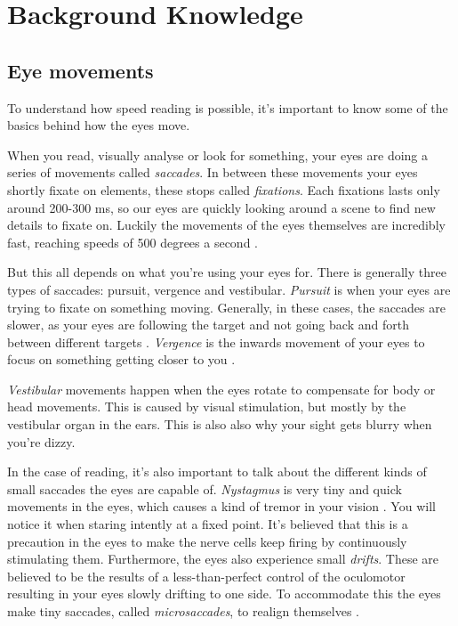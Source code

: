 \section{Background Knowledge}

\subsection{Eye movements}
To understand how speed reading is possible, it's important to know some of the basics behind how the eyes move.

When you read, visually analyse or look for something, your eyes are doing a series of movements called \textit{saccades}. In between these movements your eyes shortly fixate on elements, these stops called \textit{fixations}. Each fixations lasts only around 200-300 ms, so our eyes are quickly looking around a scene to find new details to fixate on. Luckily the movements of the eyes themselves are incredibly fast, reaching speeds of 500 degrees a second \cite{eyeMovement}.

But this all depends on what you're using your eyes for. There is generally three types of saccades: pursuit, vergence and vestibular. \textit{Pursuit} is when your eyes are trying to fixate on something moving. Generally, in these cases, the saccades are slower, as your eyes are following the target and not going back and forth between different targets \cite{eyeMovement}.
\textit{Vergence} is the inwards movement of your eyes to focus on something getting closer to you \cite{eyeMovement}.

\textit{Vestibular} movements happen when the eyes rotate to compensate for body or head movements. This is caused by visual stimulation, but mostly by the vestibular organ in the ears. This is also also why your sight gets blurry when you're dizzy.

In the case of reading, it's also important to talk about the different kinds of small saccades the eyes are capable of. \textit{Nystagmus} is very tiny and quick movements in the eyes, which causes a kind of tremor in your vision \cite{eyeMovement}. You will notice it when staring intently at a fixed point. It's believed that this is a precaution in the eyes to make the nerve cells keep firing by continuously stimulating them. Furthermore, the eyes also experience small \textit{drifts}. These are believed to be the results of a less-than-perfect control of the oculomotor resulting in your eyes slowly drifting to one side. To accommodate this the eyes make tiny saccades, called \textit{microsaccades}, to realign themselves \cite{eyeMovement}.

